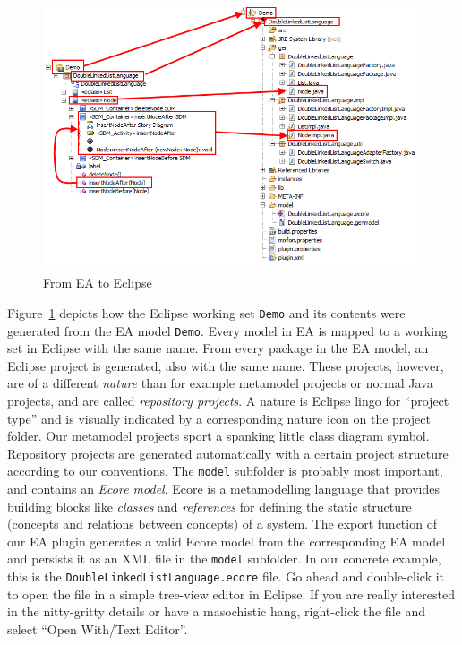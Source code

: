 \begin{figure}[htbp]
	\centering
  \includegraphics[width=\textwidth]{pics/installationAndSetup/bothexplorers}
	\caption{From EA to Eclipse}
	\label{fig_fromEAtoEclipse}
\end{figure}

Figure~\ref{fig_fromEAtoEclipse} depicts how the Eclipse working set \texttt{Demo} and its contents were generated from the EA model \texttt{Demo}.
Every model in EA is mapped to a working set in Eclipse with the same name. 
From every package in the EA model, an Eclipse project is generated, also with the same name.
These projects, however, are of a different \emph{nature} than for example metamodel projects or normal Java projects, and are called \emph{repository projects}.  
A nature is Eclipse lingo for ``project type'' and is visually indicated by a corresponding nature icon on the project folder.
Our  metamodel projects sport a spanking little class diagram symbol. 
Repository projects are generated automatically  with a certain project structure according to our conventions.  
The  \texttt{model} subfolder is probably most important, and contains an  \emph{Ecore model}.  
Ecore is a metamodelling language that provides building  blocks like \emph{classes} and \emph{references} for defining the  static structure (concepts and relations between concepts) of a system.  
The  export function of our EA plugin generates a valid Ecore model from the  corresponding EA model and persists it as an XML file in the \texttt{model}  subfolder.  
In our concrete example, this is the \texttt{DoubleLinkedListLanguage.ecore} file.  
Go ahead and double-click it to open the file in a simple tree-view editor in Eclipse.  
If you are really interested in the nitty-gritty details or have a masochistic hang, right-click the file and select ``Open With/Text Editor''. 

